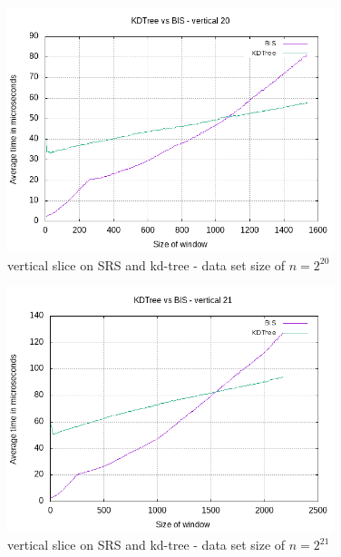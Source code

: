 \begin{figure}[h]
    \centering
    \includegraphics[width = 0.85\textwidth]{pictures/analysis/vert_20.png}
    \caption{vertical slice on SRS and kd-tree - data set size of $n=2^{20}$}\label{fig:vert_20}
\end{figure}

\begin{figure}[h]
    \centering
    \includegraphics[width = 0.85\textwidth]{pictures/analysis/vert_21.png}
    \caption{vertical slice on SRS and kd-tree - data set size of $n=2^{21}$}\label{fig:vert_21}
\end{figure}

